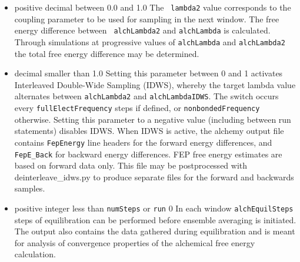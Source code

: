 \begin{itemize}
\item
{} {positive decimal between 0.0 and 1.0} {The {\tt
lambda2} value corresponds to the coupling parameter to be used for
sampling in the next window.  The free energy difference between {\tt
alchLambda2} and {\tt alchLambda} is calculated.  Through simulations
at progressive values of {\tt alchLambda} and {\tt alchLambda2} the
total free energy difference may be determined. }


\item
{}
{decimal smaller than 1.0}
{Setting this parameter between 0 and 1 activates Interleaved Double-Wide Sampling (IDWS), whereby the target lambda value alternates between {\tt alchLambda2} and {\tt alchLambdaIDWS}.
The switch occurs every {\tt fullElectFrequency} steps if defined, or {\tt nonbondedFrequency} otherwise.
Setting this parameter to a negative value (including between run statements) disables IDWS.
When IDWS is active, the alchemy output file contains {\tt FepEnergy} line headers for the forward energy differences, and {\tt FepE\_Back} for backward energy differences.
FEP free energy estimates are based on forward data only.
This file may be postprocessed with deinterleave\_idws.py to produce separate files for the forward and backwards samples.}

\item
{}
{positive integer less than {\tt numSteps} or {\tt run}}
{0}
{In each window {\tt alchEquilSteps} steps of equilibration can be
performed before ensemble averaging is initiated. The output also contains
the data gathered during equilibration and is meant for analysis of
convergence properties of the alchemical free energy calculation.}


\end{itemize}
